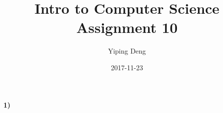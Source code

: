 \documentclass{article}
\title{Intro to Computer Science Assignment 10}
\date{2017-11-23}
\author{Yiping Deng}
\begin{document}
\maketitle
\paragraph{1)}
\end{document}
